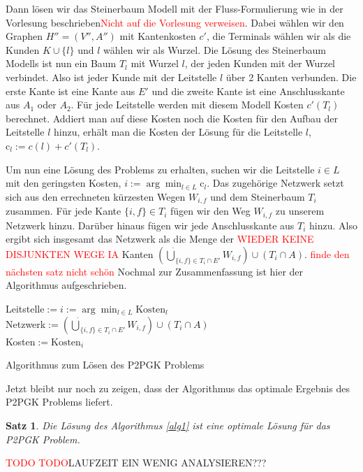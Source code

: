 \documentclass[11pt,a4paper]{article}
\makeatletter
\newcommand{\TODO}{\textcolor{red}{TODO}}
\theoremstyle{my_th_style1}
\newtheorem{satz}{Satz}
\renewenvironment{proof}[1][\proofname]{\par 
	\pushQED{\qed}%
	\normalfont \topsep6\p@\@plus6\p@\relax 
	\trivlist 
	\item[\hskip\labelsep 
	\bfseries 
	#1\@addpunct{:}]\ignorespaces 
}{%
\popQED\endtrivlist\@endpefalse 
}
\makeatother
\begin{document}
Dann lösen wir das Steinerbaum Modell mit der Fluss-Formulierung wie in der Vorlesung beschrieben\textcolor{red}{Nicht auf die Vorlesung verweisen}. Dabei wählen wir den Graphen $H''=(V'',A'')$ mit Kantenkosten $c'$, die Terminals wählen wir als die Kunden $K \cup \{l\}$ und $l$ w\"ahlen wir als Wurzel. Die Lösung des Steinerbaum Modells ist nun ein Baum $T_l$ mit Wurzel $l$, der jeden Kunden mit der Wurzel verbindet. Also ist jeder Kunde mit der Leitstelle $l$ über 2 Kanten verbunden. Die erste Kante ist eine Kante aus $E'$ und die zweite Kante ist eine Anschlusskante aus $A_1$ oder $A_2$. Für jede Leitstelle werden mit diesem Modell Kosten $c'(T_l)$ berechnet. Addiert man auf diese Kosten noch die Kosten für den Aufbau der Leitstelle $l$ hinzu, erhält man die Kosten der Lösung für die Leitstelle \(l\), $\text{c}_l:=c(l)+c'(T_l)$.

Um nun eine Lösung des Problems zu erhalten, suchen wir die Leitstelle $i \in L$ mit den geringsten Kosten, $i:=\arg \displaystyle\min_{l \in L} \text{c}_l$. Das zugehörige Netzwerk setzt sich aus den errechneten kürzesten Wegen  $W_{i,f}$ und dem Steinerbaum $T_i$ zusammen. Für jede Kante $\{i,f\} \in T_i$ fügen wir den Weg $W_{i,f}$ zu unserem Netzwerk hinzu. Darüber hinaus fügen wir jede Anschlusskante aus $T_i$ hinzu. Also ergibt sich insgesamt das Netzwerk als die Menge der \textcolor{red}{WIEDER KEINE DISJUNKTEN WEGE IA} Kanten $(\dot{\bigcup}_{\{i,f\} \in T_i \cap E'}W_{i,f}) \cup (T_i\cap A)$.
\textcolor{red}{finde den n\"achsten satz nicht sch\"on}
Nochmal zur Zusammenfassung ist hier der Algorithmus aufgeschrieben.

\vspace{0.5cm}
\begin{algorithm}[H]
	\label{alg1}
\BlankLine

	Leitstelle$:=i:=\arg \displaystyle\min_{l \in L} \text{Kosten}_l$\\
	Netzwerk$:=(\dot{\bigcup}_{\{i,f\} \in T_i \cap E'}W_{i,f}) \cup (T_i\cap A)$\\
	Kosten$:=\text{Kosten}_{i}$
	\BlankLine
\caption{Algorithmus zum Lösen des P2PGK Problems}
\end{algorithm}
\vspace{0.5cm}
Jetzt bleibt nur noch zu zeigen, dass der Algorithmus das optimale Ergebnis des P2PGK Problems liefert.
\begin{satz}
	Die Lösung des Algorithmus \ref{alg1} ist eine optimale Lösung für das P2PGK Problem.
\end{satz}
\begin{proof}
	\TODO
\end{proof}
\TODO LAUFZEIT EIN WENIG ANALYSIEREN???
\end{document}
